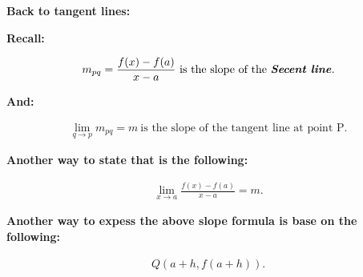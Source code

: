 \documentclass{report}
\begin{document}
        \bigbreak \noindent \bigbreak \noindent \bigbreak \noindent 

        \bigbreak \noindent \bigbreak \noindent 
        \begin{large}
            \textbf{Back to tangent lines:}
        \end{large}

        \bigbreak \noindent \bigbreak \noindent 
        \begin{center}
            \textbf{Recall:}
        \end{center}
        \begin{align*}
            m_{pq} = \frac{f(x) - f(a)}{x - a}\ \text{is the slope of the \textbf{\textit{Secent line}}} 
        .\end{align*}

        \bigbreak \noindent 
        \begin{center}
            \textbf{And:}
        \end{center}
        \begin{align*}
            \lim\limits_{q \to p}{m_{pq} = m}\ \text{is the slope of the tangent line at point P}
        .\end{align*}

        \bigbreak \noindent 
        \begin{center}
            \textbf{Another way to state that is the following:}
        \end{center}
        \begin{align*}
            \lim\limits_{x \to a}{ \frac{f(x) - f(a)}{x-a} = m }
        .\end{align*}

        \bigbreak \noindent 
        \begin{center}
            \textbf{Another way to expess the above slope formula is base on the following:}
        \end{center}

        \bigbreak \noindent 
        \begin{align*}
            Q \left(a+h, f \left(a+h\right)\right)
        .\end{align*}
\end{document}
